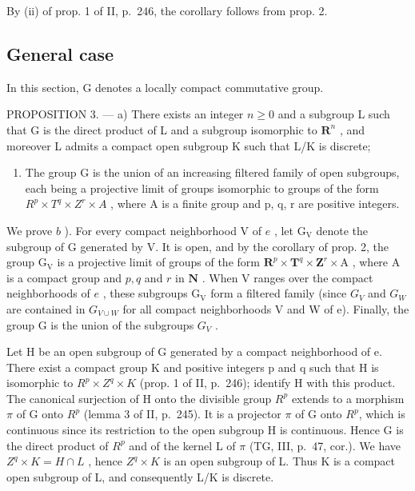 By (ii) of prop. 1 of II, p.~246, the corollary follows from prop. 2.

\subsection{General case}

In this section, G denotes a locally compact commutative group.

PROPOSITION 3. --- a) There exists an integer \(n \geqslant 0\) and a subgroup L such that G is the direct product of L and a subgroup isomorphic to \(\mathbf{R}^n\) , and moreover L admits a compact open subgroup K such that L/K is discrete;

\begin{enumerate}
\def\labelenumi{\alph{enumi})}
\setcounter{enumi}{1}
\tightlist
\item
  The group G is the union of an increasing filtered family of open subgroups, each being a projective limit of groups isomorphic to groups of the form \(R^{p} \times T^{q} \times Z^{r} \times A\) , where A is a finite group and p, q, r are positive integers.
\end{enumerate}

We prove \(b\) ). For every compact neighborhood V of \(e\) , let \(\mathrm{G_V}\) denote the subgroup of G generated by V. It is open, and by the corollary of prop. 2, the group \(\mathrm{G_V}\) is a projective limit of groups of the form \(\mathbf{R}^p\times \mathbf{T}^q\times \mathbf{Z}^r\times \mathrm{A}\) , where A is a compact group and \(p,q\) and \(r\) in \(\mathbf{N}\) . When V ranges over the compact neighborhoods of \(e\) , these subgroups \(\mathrm{G_V}\) form a filtered family (since \(G_{V}\) and \(G_{W}\) are contained in \(G_{V\cup W}\) for all compact neighborhoods V and W of e). Finally, the group G is the union of the subgroups \(G_{V}\) .

Let H be an open subgroup of G generated by a compact neighborhood of e. There exist a compact group K and positive integers p and q such that H is isomorphic to \(R^{p} \times Z^{q} \times K\) (prop. 1 of II, p.~246); identify H with this product. The canonical surjection of H onto the divisible group \(R^{p}\) extends to a morphism \(\pi\) of G onto \(R^{p}\) (lemma 3 of II, p.~245). It is a projector \(\pi\) of G onto \(R^{p}\), which is continuous since its restriction to the open subgroup H is continuous. Hence G is the direct product of \(R^{p}\) and of the kernel L of \(\pi\) (TG, III, p.~47, cor.). We have \(Z^{q} \times K = H \cap L\) , hence \(Z^{q} \times K\) is an open subgroup of L. Thus K is a compact open subgroup of L, and consequently L/K is discrete.

